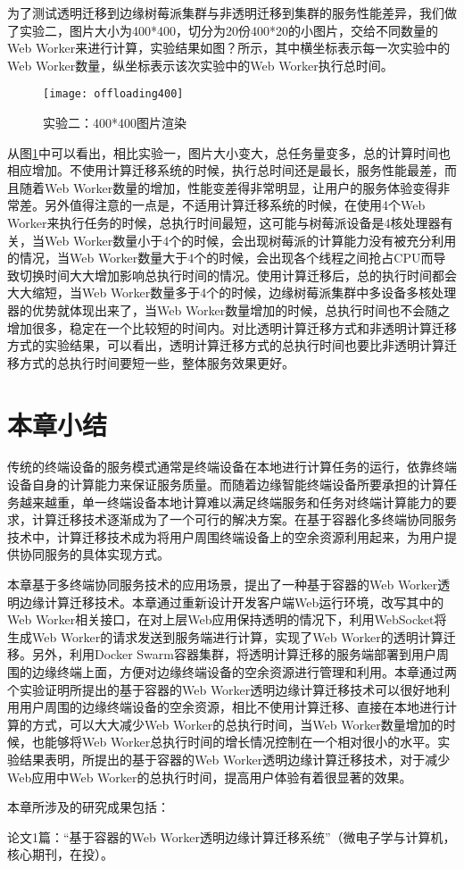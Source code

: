 为了测试透明迁移到边缘树莓派集群与非透明迁移到集群的服务性能差异，我们做了实验二，图片大小为400*400，切分为20份400*20的小图片，交给不同数量的Web Worker来进行计算，实验结果如图？所示，其中横坐标表示每一次实验中的Web Worker数量，纵坐标表示该次实验中的Web Worker执行总时间。

\begin{figure}[!htbp]
    \centering
    \texttt{[image: offloading400]}
    \caption{实验二：400*400图片渲染}
    \label{fig:computation_offloading_result_picture_400}
\end{figure}

从图\ref{fig:computation_offloading_result_picture_400}中可以看出，相比实验一，图片大小变大，总任务量变多，总的计算时间也相应增加。不使用计算迁移系统的时候，执行总时间还是最长，服务性能最差，而且随着Web Worker数量的增加，性能变差得非常明显，让用户的服务体验变得非常差。另外值得注意的一点是，不适用计算迁移系统的时候，在使用4个Web Worker来执行任务的时候，总执行时间最短，这可能与树莓派设备是4核处理器有关，当Web Worker数量小于4个的时候，会出现树莓派的计算能力没有被充分利用的情况，当Web Worker数量大于4个的时候，会出现各个线程之间抢占CPU而导致切换时间大大增加影响总执行时间的情况。使用计算迁移后，总的执行时间都会大大缩短，当Web Worker数量多于4个的时候，边缘树莓派集群中多设备多核处理器的优势就体现出来了，当Web Worker数量增加的时候，总执行时间也不会随之增加很多，稳定在一个比较短的时间内。对比透明计算迁移方式和非透明计算迁移方式的实验结果，可以看出，透明计算迁移方式的总执行时间也要比非透明计算迁移方式的总执行时间要短一些，整体服务效果更好。

\section{本章小结}\label{sec:computation_offloading_summary}

传统的终端设备的服务模式通常是终端设备在本地进行计算任务的运行，依靠终端设备自身的计算能力来保证服务质量。而随着边缘智能终端设备所要承担的计算任务越来越重，单一终端设备本地计算难以满足终端服务和任务对终端计算能力的要求，计算迁移技术逐渐成为了一个可行的解决方案。在基于容器化多终端协同服务技术中，计算迁移技术成为将用户周围终端设备上的空余资源利用起来，为用户提供协同服务的具体实现方式。

本章基于多终端协同服务技术的应用场景，提出了一种基于容器的Web Worker透明边缘计算迁移技术。本章通过重新设计开发客户端Web运行环境，改写其中的Web Worker相关接口，在对上层Web应用保持透明的情况下，利用WebSocket将生成Web Worker的请求发送到服务端进行计算，实现了Web Worker的透明计算迁移。另外，利用Docker Swarm容器集群，将透明计算迁移的服务端部署到用户周围的边缘终端上面，方便对边缘终端设备的空余资源进行管理和利用。本章通过两个实验证明所提出的基于容器的Web Worker透明边缘计算迁移技术可以很好地利用用户周围的边缘终端设备的空余资源，相比不使用计算迁移、直接在本地进行计算的方式，可以大大减少Web Worker的总执行时间，当Web Worker数量增加的时候，也能够将Web Worker总执行时间的增长情况控制在一个相对很小的水平。实验结果表明，所提出的基于容器的Web Worker透明边缘计算迁移技术，对于减少Web应用中Web Worker的总执行时间，提高用户体验有着很显著的效果。

本章所涉及的研究成果包括：

论文1篇：“基于容器的Web Worker透明边缘计算迁移系统”（微电子学与计算机，核心期刊，在投）。
